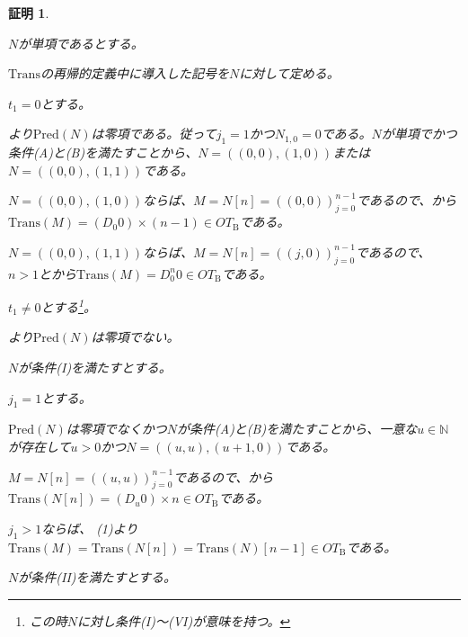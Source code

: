 \documentclass[dvipdfmx,uplatex]{jsarticle}
\theoremstyle{customnonumberbreakfortheorem}
\theoremstyle{customnonumberbreakforproof}
\newtheorem{hideableproof}{証明}
\begin{document}
\begin{hideableproof}
\begin{indented}
\begin{indented}
			\item \(N\)が単項であるとする。
			\begin{indented}
				\item \(\textrm{Trans}\)の再帰的定義中に導入した記号を\(N\)に対して定める。
				\item \(t_1 = 0\)とする。
				\item {}より\(\textrm{Pred}(N)\)は零項である。従って\(j_1 = 1\)かつ\(N_{1,0} = 0\)である。\(N\)が単項でかつ条件(A)と(B)を満たすことから、\(N = ((0,0),(1,0))\)または\(N = ((0,0),(1,1))\)である。
				\begin{indented}
					\item \(N = ((0,0),(1,0))\)ならば、\(M = N[n] = ((0,0))_{j=0}^{n-1}\)であるので、から\(\textrm{Trans}(M) = (D_0 0) \times (n-1) \in OT_{\textrm{B}}\)である。
					\item \(N = ((0,0),(1,1))\)ならば、\(M = N[n] = ((j,0))_{j=0}^{n-1}\)であるので、\(n > 1\)とから\(\textrm{Trans}(M) = D_0^n 0 \in OT_{\textrm{B}}\)である。
				\end{indented}
				\item \(t_1 \neq 0\)とする\footnote{この時\(N\)に対し条件(I)～(VI)が意味を持つ。}。
				\item {}より\(\textrm{Pred}(N)\)は零項でない。
				\item \(N\)が条件(I)を満たすとする。
				\begin{indented}
					\item \(j_1 = 1\)とする。
					\begin{indented}
						\item \(\textrm{Pred}(N)\)は零項でなくかつ\(N\)が条件(A)と(B)を満たすことから、一意な\(u \in \mathbb{N}\)が存在して\(u > 0\)かつ\(N = ((u,u),(u+1,0))\)である。
						\item \(M = N[n] = ((u,u))_{j=0}^{n-1}\)であるので、から\(\textrm{Trans}(N[n]) = (D_u 0) \times n \in OT_{\textrm{B}}\)である。
					\end{indented}
					\item \(j_1 > 1\)ならば、 (1)より\(\textrm{Trans}(M) = \textrm{Trans}(N[n]) = \textrm{Trans}(N)[n-1] \in OT_{\textrm{B}}\)である。
				\end{indented}
				\item
				\item \(N\)が条件(II)を満たすとする。

\end{indented}
\end{indented}
\end{indented}
\end{hideableproof}
\end{document}
